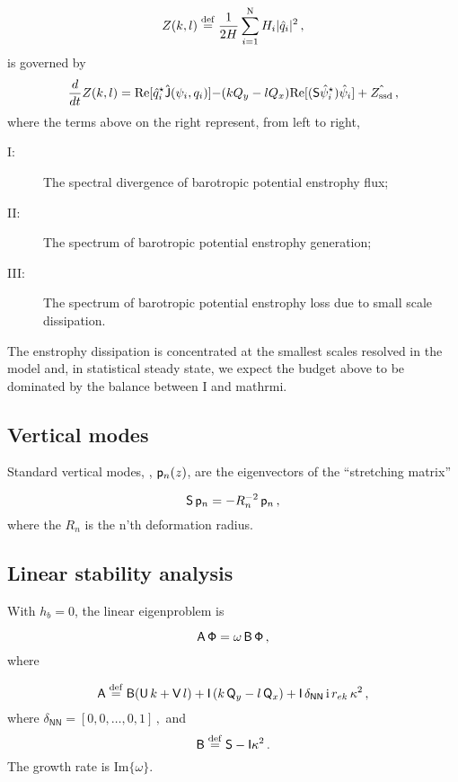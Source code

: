 \documentclass[11pt]{article}
\newcommand{\ssd}{\text{ssd}}
\newcommand{\sS}{\mathsf{S}}
\begin{document}
\begin{equation}
Z(k,l) \defn \frac{1}{2H} \sum_{i=1}^{\nmax} H_i |\hat{q}_i|^2\com
\end{equation}
is governed by
\begin{equation}
    \frac{d}{d t} Z(k,l) = {\text{Re}[\hat{q}_i^\star {\mathsf{\hat{J}}(\psi_i,q_i) ]}}
    {-(k Q_y - l Q_x)\text{Re}[(\sS \hat{\psi}_i^\star)\hat{\psi}_i]}
    + { {\hat{Z_\ssd}}}\com
\end{equation}
where the terms above on the right represent, from
left to right,
\begin{description}
    \item[I:]   The spectral divergence of barotropic potential enstrophy flux;
    \item[II:]  The spectrum of  barotropic potential enstrophy generation;
    \item[III:] The spectrum of  barotropic potential enstrophy loss due to small scale dissipation.
\end{description}
The enstrophy dissipation is concentrated at the smallest scales resolved in the model and, in statistical steady
state, we expect the budget above to be dominated by the balance between I and mathrm{i}.

\subsection*{Vertical modes}
Standard vertical modes, , $\sp_n (z)$, are the eigenvectors of the ``stretching matrix''

\begin{equation}
\sS \,\sp_n = -R_n^{-2}\, \sp_n\,,
\end{equation}
where the $R_n$ is the n'th deformation radius.

\subsection*{Linear stability analysis}

With $h_b = 0$, the linear eigenproblem is

\begin{equation}
 \sA \, \mathsf{\Phi} = \omega \, \sB\, \mathsf{\Phi}\,,
\end{equation}
where

\begin{equation}
\sA \defn \mathsf{B}(\mathsf{U}\, k + \mathsf{V}\,l) + \mathsf{I}\left(k\,\mathsf{Q}_y - l\,\mathsf{Q}_x\right) + \mathsf{I}\,\delta_{\mathsf{N}\mathsf{N}}\, \mathrm{i} \,r_{ek}\,\kappa^2\,,
\end{equation}
where $\delta_{\mathsf{N}\mathsf{N}} = [0,0,\dots,0,1]\,,$
and 
\begin{equation}
\mathsf{B} \defn  \mathsf{S} - \mathsf{I} \kappa^2\,. 
\end{equation}
The growth rate is Im$\{\omega\}$.
\end{document}

